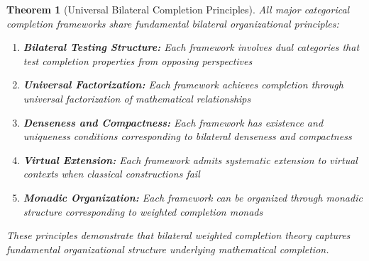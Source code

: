 \documentclass[11pt]{article}
\theoremstyle{plain}
\newtheorem{theorem}{Theorem}[section]
\theoremstyle{definition}
\theoremstyle{remark}
\begin{document}
\begin{theorem}[Universal Bilateral Completion Principles]\label{thm:universal-bilateral-principles}
All major categorical completion frameworks share fundamental bilateral organizational principles:

\begin{enumerate}
\item \textbf{Bilateral Testing Structure:} Each framework involves dual categories that test completion properties from opposing perspectives

\item \textbf{Universal Factorization:} Each framework achieves completion through universal factorization of mathematical relationships

\item \textbf{Denseness and Compactness:} Each framework has existence and uniqueness conditions corresponding to bilateral denseness and compactness

\item \textbf{Virtual Extension:} Each framework admits systematic extension to virtual contexts when classical constructions fail

\item \textbf{Monadic Organization:} Each framework can be organized through monadic structure corresponding to weighted completion monads
\end{enumerate}

These principles demonstrate that bilateral weighted completion theory captures fundamental organizational structure underlying mathematical completion.
\end{theorem}
\end{document}
